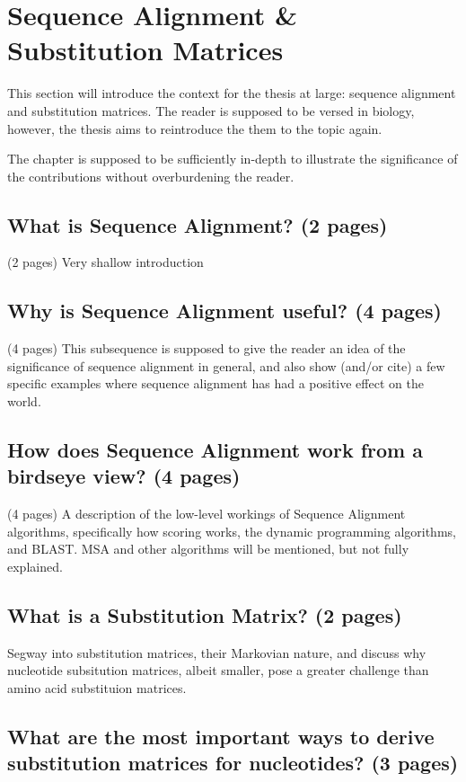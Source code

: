 \documentclass{article}
\begin{document}
\section{Sequence Alignment \& Substitution Matrices}
This section will introduce the context for the thesis at large: sequence alignment
and substitution matrices. The reader is supposed to be versed in biology, however,
the thesis aims to reintroduce the them to the topic again.

The chapter is supposed to be sufficiently in-depth to illustrate the significance of the
contributions without overburdening the reader.

%
%
%
\subsection{What is Sequence Alignment? (2 pages)}
(2 pages)
Very shallow introduction
%
%
\subsection{Why is Sequence Alignment useful? (4 pages)}
(4 pages)
This subsequence is supposed to give the reader an idea of the significance of sequence alignment
in general, and also show (and/or cite) a few specific examples where sequence alignment
has had a positive effect on the world.

%
%
%
\subsection{How does Sequence Alignment work from a birdseye view? (4 pages)}
(4 pages)
A description of the low-level workings of Sequence Alignment algorithms, specifically
how scoring works, the dynamic programming algorithms, and BLAST. MSA and other algorithms will
be mentioned, but not fully explained.
%
%
%
\subsection{What is a Substitution Matrix? (2 pages)}
Segway into substitution matrices, their Markovian nature, and discuss why nucleotide subsitution matrices,
albeit smaller, pose a greater challenge than amino acid substituion matrices.
%
%
%
\subsection{What are the most important ways to derive substitution matrices for nucleotides? (3 pages)}
\end{document}
